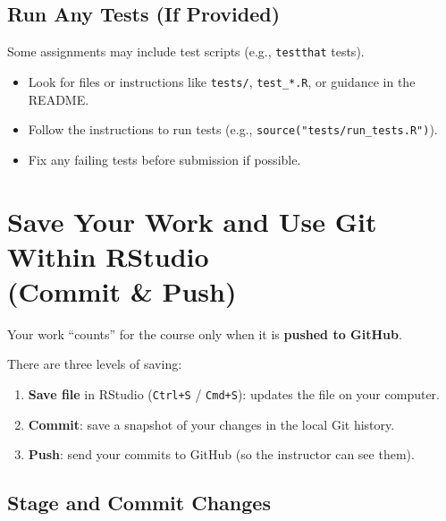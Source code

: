 \documentclass[11pt]{scrartcl}
\begin{document}
\subsection{Run Any Tests (If Provided)}

Some assignments may include test scripts (e.g., \texttt{testthat} tests).

\begin{itemize}[nosep]
  \item Look for files or instructions like \texttt{tests/}, \texttt{test\_*.R}, or guidance in the README.
  \item Follow the instructions to run tests (e.g., \verb|source("tests/run_tests.R")|).
  \item Fix any failing tests before submission if possible.
\end{itemize}

\section{Save Your Work and Use Git Within RStudio\\(Commit \& Push)}

Your work ``counts'' for the course only when it is \textbf{pushed to GitHub}.

There are three levels of saving:

\begin{enumerate}[label=\arabic*., nosep]
  \item \textbf{Save file} in RStudio (\texttt{Ctrl+S} / \texttt{Cmd+S}): updates the file on your computer.
  \item \textbf{Commit}: save a snapshot of your changes in the local Git history.
  \item \textbf{Push}: send your commits to GitHub (so the instructor can see them).
\end{enumerate}

\subsection{Stage and Commit Changes}
\end{document}
